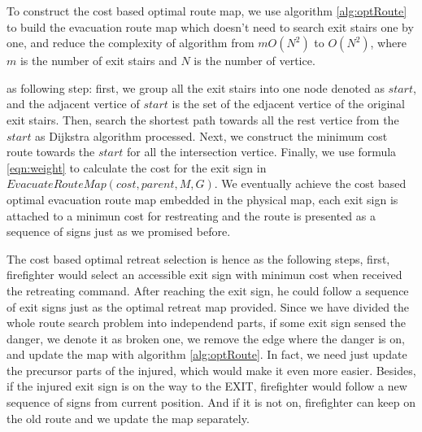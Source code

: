 \documentclass[conference]{IEEEtran}
\begin{document}
    To construct the cost based optimal route map, we use algorithm \ref{alg:optRoute} to build the evacuation route map which doesn't need to search exit stairs one by one, and reduce the complexity of algorithm from $mO(N^2)$ to $O(N^2)$, where $m$ is the number of exit stairs and $N$ is the number of vertice.

     as following step: first, we group all the exit stairs into one node denoted as $start$, and the adjacent vertice of $start$ is the set of the edjacent vertice of the original exit stairs. Then, search the shortest path towards all the rest vertice from the $start$ as Dijkstra algorithm processed. Next, we construct the minimum cost route towards the $start$ for all the intersection vertice. Finally, we use formula \ref{eqn:weight} to calculate the cost for the exit sign in $EvacuateRouteMap(cost,parent,M,G)$. We eventually achieve the cost based optimal evacuation route map embedded in the physical map, each exit sign is attached to a minimun cost for restreating and the route is presented as a sequence of signs just as we promised before.     
 
    
    The cost based optimal retreat selection is hence as the following steps, first, firefighter would select an accessible exit sign with minimun cost when received the retreating command. After reaching the exit sign, he could follow a sequence of exit signs just as the optimal retreat map provided. Since we have divided the whole route search problem into independend parts, if some exit sign sensed the danger, we denote it as broken one, we remove the edge where the danger is on, and update the map with algorithm \ref{alg:optRoute}. In fact, we need just update the precursor parts of the injured, which would make it even more easier. Besides, if the injured exit sign is on the way to the EXIT, firefighter would follow a new sequence of signs from current position. And if it is not on, firefighter can keep on the old route and we update the map separately.

\end{document}
